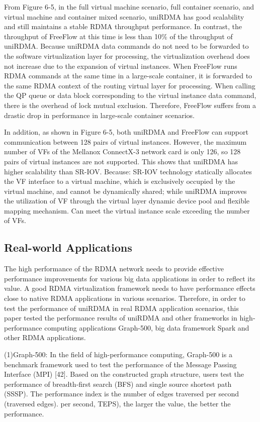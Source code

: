 \documentclass[sigplan,screen]{acmart}
\begin{document}
From Figure 6-5, in the full virtual machine scenario, full container scenario, and virtual machine and container mixed scenario, uniRDMA has good scalability and still maintains a stable RDMA throughput performance. In contrast, the throughput of FreeFlow at this time is less than 10\% of the throughput of uniRDMA. Because uniRDMA data commands do not need to be forwarded to the software virtualization layer for processing, the virtualization overhead does not increase due to the expansion of virtual instances. When FreeFlow runs RDMA commands at the same time in a large-scale container, it is forwarded to the same RDMA context of the routing virtual layer for processing. When calling the QP queue or data block corresponding to the virtual instance data command, there is the overhead of lock mutual exclusion. Therefore, FreeFlow suffers from a drastic drop in performance in large-scale container scenarios.

In addition, as shown in Figure 6-5, both uniRDMA and FreeFlow can support communication between 128 pairs of virtual instances. However, the maximum number of VFs of the Mellanox ConnectX-3 network card is only 126, so 128 pairs of virtual instances are not supported. This shows that uniRDMA has higher scalability than SR-IOV. Because: SR-IOV technology statically allocates the VF interface to a virtual machine, which is exclusively occupied by the virtual machine, and cannot be dynamically shared; while uniRDMA improves the utilization of VF through the virtual layer dynamic device pool and flexible mapping mechanism. Can meet the virtual instance scale exceeding the number of VFs.

\subsection{Real-world Applications}

The high performance of the RDMA network needs to provide effective performance improvements for various big data applications in order to reflect its value. A good RDMA virtualization framework needs to have performance effects close to native RDMA applications in various scenarios. Therefore, in order to test the performance of uniRDMA in real RDMA application scenarios, this paper tested the performance results of uniRDMA and other frameworks in high-performance computing applications Graph-500, big data framework Spark and other RDMA applications.

(1)Graph-500: In the field of high-performance computing, Graph-500 is a benchmark framework used to test the performance of the Message Passing Interface (MPI) [42]. Based on the constructed graph structure, users test the performance of breadth-first search (BFS) and single source shortest path (SSSP). The performance index is the number of edges traversed per second (traversed edges). per second, TEPS), the larger the value, the better the performance.
\end{document}
